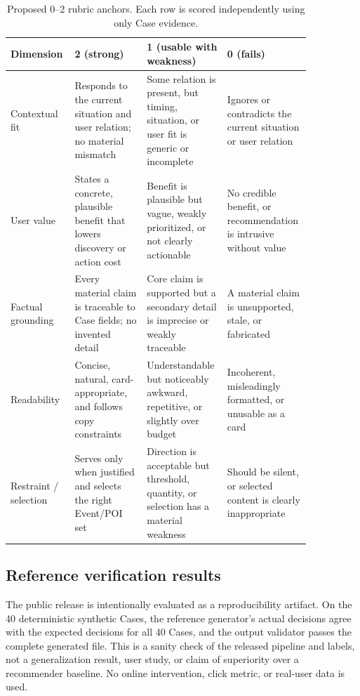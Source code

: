 \documentclass[10pt]{article}
\begin{document}
\clearpage
\begin{table}[t]
\centering
\scriptsize
\caption{Proposed 0--2 rubric anchors. Each row is scored independently using only Case evidence.}
\label{tab:rubric-anchors}
\begin{tabular}{P{0.16\linewidth}P{0.23\linewidth}P{0.23\linewidth}P{0.23\linewidth}}
\toprule
Dimension & 2 (strong) & 1 (usable with weakness) & 0 (fails) \\
\midrule
Contextual fit & Responds to the current situation and user relation; no material mismatch & Some relation is present, but timing, situation, or user fit is generic or incomplete & Ignores or contradicts the current situation or user relation \\
User value & States a concrete, plausible benefit that lowers discovery or action cost & Benefit is plausible but vague, weakly prioritized, or not clearly actionable & No credible benefit, or recommendation is intrusive without value \\
Factual grounding & Every material claim is traceable to Case fields; no invented detail & Core claim is supported but a secondary detail is imprecise or weakly traceable & A material claim is unsupported, stale, or fabricated \\
Readability & Concise, natural, card-appropriate, and follows copy constraints & Understandable but noticeably awkward, repetitive, or slightly over budget & Incoherent, misleadingly formatted, or unusable as a card \\
Restraint / selection & Serves only when justified and selects the right Event/POI set & Direction is acceptable but threshold, quantity, or selection has a material weakness & Should be silent, or selected content is clearly inappropriate \\
\bottomrule
\end{tabular}
\end{table}

\subsection{Reference verification results}

The public release is intentionally evaluated as a reproducibility artifact. On the 40 deterministic synthetic Cases, the reference generator's actual decisions agree with the expected decisions for all 40 Cases, and the output validator passes the complete generated file. This is a sanity check of the released pipeline and labels, not a generalization result, user study, or claim of superiority over a recommender baseline. No online intervention, click metric, or real-user data is used.
\end{document}
